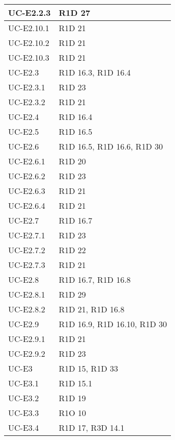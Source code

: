 \begin{center}
\begin{longtable}{ |  p{5cm} | p{5cm} |}
    UC-E2.2.3 & R1D 27 \\ \hline
    UC-E2.10.1 & R1D 21 \\ \hline
    UC-E2.10.2 & R1D 21 \\ \hline
    UC-E2.10.3 & R1D 21 \\ \hline
    UC-E2.3 & R1D 16.3, R1D 16.4 \\ \hline
    UC-E2.3.1 & R1D 23 \\ \hline
    UC-E2.3.2 & R1D 21 \\ \hline
    UC-E2.4 & R1D 16.4 \\ \hline
    UC-E2.5 & R1D 16.5 \\ \hline
    UC-E2.6 & R1D 16.5, R1D 16.6, R1D 30 \\ \hline
    UC-E2.6.1 & R1D 20 \\ \hline
    UC-E2.6.2 & R1D 23 \\ \hline
    UC-E2.6.3 & R1D 21 \\ \hline
    UC-E2.6.4 & R1D 21 \\ \hline
    UC-E2.7 & R1D 16.7 \\ \hline
    UC-E2.7.1 & R1D 23 \\ \hline
    UC-E2.7.2 & R1D 22 \\ \hline
    UC-E2.7.3 & R1D 21 \\ \hline
    UC-E2.8 & R1D 16.7, R1D 16.8 \\ \hline
    UC-E2.8.1 & R1D 29 \\ \hline
    UC-E2.8.2 & R1D 21, R1D 16.8 \\ \hline
    UC-E2.9 & R1D 16.9, R1D 16.10, R1D 30 \\ \hline 
    UC-E2.9.1 & R1D 21 \\ \hline
    UC-E2.9.2 & R1D 23 \\ \hline
    UC-E3 & R1D 15, R1D 33 \\ \hline
    UC-E3.1 & R1D 15.1 \\ \hline
    UC-E3.2 & R1D 19 \\ \hline
    UC-E3.3 & R1O 10 \\ \hline
    UC-E3.4 & R1D 17, R3D 14.1 \\ \hline
    \end{longtable}
  \egroup
\end{center}
